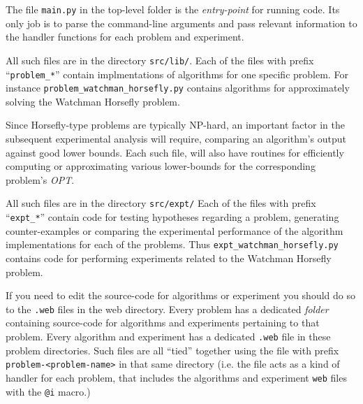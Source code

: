 \documentclass[11.5pt]{report}
\begin{document}
\newchunk 
\begin{alphalist}

\item {} The file \verb|main.py| in the top-level folder is the 
\textit{entry-point} for running code. Its only job is to parse the 
command-line arguments and pass relevant information to the handler 
functions for each problem and experiment. 


\item {} All such files are in the directory \texttt{src/lib/}.
  Each of the files with prefix ``\verb|problem_*|'' contain implmentations of 
  algorithms for one specific problem. For instance \verb|problem_watchman_horsefly.py| 
  contains algorithms for approximately solving the Watchman Horsefly problem. 
 
  Since Horsefly-type problems are typically NP-hard, an important factor in 
  the subsequent experimental analysis will require, comparing an algorithm's  
  output against good lower bounds. Each such file, will also have routines
  for efficiently computing or approximating various lower-bounds for the 
  corresponding problem's \textit{OPT}. 

\item {} All such files are in the directory \texttt{src/expt/}
 Each of the files with prefix ``\verb|expt_*|'' 
 contain code for testing hypotheses regarding a problem, generating 
 counter-examples or comparing the experimental performance of the 
 algorithm implementations for each of the problems. Thus 
 \verb|expt_watchman_horsefly.py| contains 
 code for performing experiments related to the 
 Watchman Horsefly problem. 
\end{alphalist}


If you need to edit the source-code for algorithms or experiment 
you should do so to the \texttt{.web} files in the web directory. Every problem
has a dedicated \textit{folder} containing source-code for algorithms and experiments 
pertaining to that problem. Every algorithm and experiment has a dedicated \verb|.web|
file in these problem directories. Such files are all ``tied'' together using the 
file with prefix \verb|problem-<problem-name>| in that same directory (i.e.
the file acts as a kind of handler for each problem, that includes the algorithms
and experiment \verb|web| files with the \verb|@i| macro.) 
\end{document}
